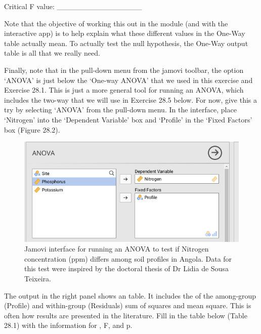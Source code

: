 \documentclass[
  openany]{krantz}
\begin{document}
Critical F value: \_\_\_\_\_\_\_\_\_\_\_\_\_\_\_\_

Note that the objective of working this out in the  module (and with the interactive app) is to help explain what these different values in the One-Way  table actually mean.
To actually test the null hypothesis, the One-Way  output table is all that we really need.

Finally, note that in the  pull-down menu from the jamovi toolbar, the option `ANOVA' is just below the `One-way ANOVA' that we used in this exercise and Exercise 28.1.
This is just a more general tool for running an ANOVA, which includes the two-way  that we will use in Exercise 28.5 below.
For now, give this a try by selecting `ANOVA' from the pull-down menu.
In the  interface, place `Nitrogen' into the `Dependent Variable' box and `Profile' in the `Fixed Factors' box (Figure 28.2).

\begin{figure}
\includegraphics[width=1\linewidth]{img/jamovi_ANOVA_input} \caption{Jamovi interface for running an ANOVA to test if Nitrogen concentration (ppm) differs among soil profiles in Angola. Data for this test were inspired by the doctoral thesis of Dr Lidia de Sousa Teixeira.}\label{fig:unnamed-chunk-114}
\end{figure}

The output in the right panel shows an  table.
It includes the  of the among-group (Profile) and within-group (Residuals) sum of squares and mean square.
This is often how  results are presented in the literature.
Fill in the table below (Table 28.1) with the information for , F, and p.
\end{document}
